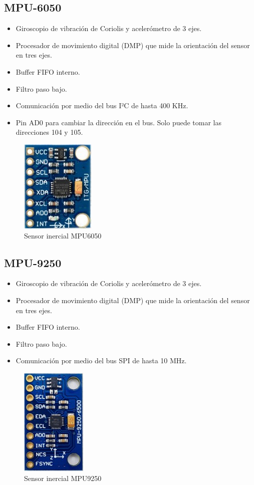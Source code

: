 \documentclass[12pt, twoside]{report}
\begin{document}
\subsection*{MPU-6050}
\begin{itemize}
	\item Giroscopio de vibración de Coriolis y acelerómetro de 3 ejes.
	\item Procesador de movimiento digital (DMP) que mide la orientación del sensor en tres ejes.
	\item Buffer FIFO interno.
	\item Filtro paso bajo.
	\item Comunicación por medio del bus I²C de hasta 400 KHz.
	\item Pin AD0 para cambiar la dirección en el bus. Solo puede tomar las direcciones 104 y 105.
\end{itemize}

\begin{figure}[htb]
	\centering
	\includegraphics[scale=0.5]{mpu6050.jpg}
	\caption{Sensor inercial MPU6050}
\end{figure}

\subsection*{MPU-9250}
\begin{itemize}
	\item Giroscopio de vibración de Coriolis y acelerómetro de 3 ejes.
	\item Procesador de movimiento digital (DMP) que mide la orientación del sensor en tres ejes.
	\item Buffer FIFO interno.
	\item Filtro paso bajo.
	\item Comunicación por medio del bus SPI de hasta 10 MHz.
\end{itemize}

\begin{figure}[htb]
	\centering
	\includegraphics[scale=0.4]{mpu9250.jpg}
	\caption{Sensor inercial MPU9250}
\end{figure}
\end{document}
